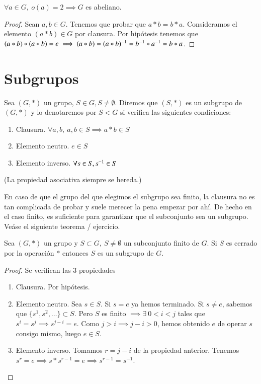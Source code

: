 \begin{cor}
	$\forall a \in G,\ o(a) = 2 \implies G$ es abeliano.
\end{cor}

\begin{proof}
	Sean $a,b \in G$. Tenemos que probar que $a\ast b = b \ast a$. Consideramos el elemento $(a \ast b) \in G$ por clausura. Por hipótesis tenemos que $(a \ast b) \ast (a \ast b) = e \implies (a \ast b) = (a \ast b)^{-1} = b^{-1} \ast a^{-1} = b \ast a$.
\end{proof}

\section{Subgrupos}

\begin{dfn}[Subgrupo]
	Sea $(G, \ast)$ un grupo, $S \in G, S \neq \emptyset$. Diremos que $(S, \ast)$ es un subgrupo de $(G, \ast)$ y lo denotaremos por $S < G$ si verifica las siguientes condiciones:
	\begin{enumerate}
		\item Clausura. $\forall a, b,\ a,b \in S \implies a \ast b \in S$
		\item Elemento neutro. $e \in S$
		\item Elemento inverso. $\forall s \in S, s^{-1} \in S$ 
	\end{enumerate}
	(La propiedad asociativa siempre se hereda.)
\end{dfn}

En caso de que el grupo del que elegimos el subgrupo sea finito, la clausura no es tan complicada de probar y suele merecer la pena empezar por ahí. De hecho en el caso finito, es suficiente para garantizar que el subconjunto sea un subgrupo. Veáse el siguiente teorema / ejercicio.

\begin{thm}
	\label{thm:subconjuntocerrado}
	Sea $(G, \ast)$ un grupo y $S \subset G,\ S \neq \emptyset$ un subconjunto finito de $G$. Si $S$ es cerrado por la operación $\ast$ entonces $S$ es un subgrupo de $G$.
\end{thm}

\begin{proof}
	Se verifican las 3 propiedades
	\begin{enumerate}
		\item Clausura. Por hipótesis.
		\item Elemento neutro. Sea $s \in S$. Si $s = e$ ya hemos terminado. Si $s \neq e$, sabemos que $\{s^1, s^2, \dots\} \subset S$. Pero $S$ es finito $\implies \exists\ 0 < i < j$ tales que $s^i = s^j \implies s^{j - i} = e$. Como $j > i \implies j - i > 0$, hemos obtenido $e$ de operar $s$ consigo mismo, luego $e \in S$.
		\item Elemento inverso. Tomamos $r = j - i$ de la propiedad anterior. Tenemos $s^r = e \implies s \ast s^{r-1} = e \implies s^{r-1} = s^{-1}$.
	\end{enumerate}
\end{proof}

